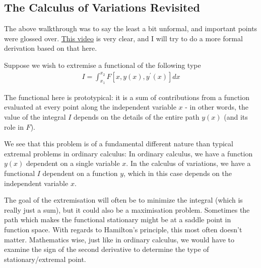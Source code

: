 \documentclass[a4paper]{article}
\begin{document}
    \subsection{The Calculus of Variations Revisited}
    The above walkthrough was to say the least a bit unformal, and important points were glossed over. \href{https://www.youtube.com/watch?v=VCHFCXgYdvY&list=PL2ym2L69yzkamORF9DGWRhE9qUnb0_-6H&index=1&t=230s&ab_channel=GoodVibrationswithFreeball}{This video} is very clear, and I will try to do a more formal derivation based on that here.

    Suppose we wish to extremise a functional of the following type \begin{align*}
        I = \int_{x_1} ^{x_2} F\left[x, y(x), y^{\prime}(x)\right]dx
    \end{align*}

    The functional here is prototypical: it is a sum of contributions from a function evaluated at every point along the independent variable \(x\) - in other words, the value of the integral \(I\) depends on the details of the entire path \(y(x)\) (and its role in \(F\)).
    
    We see that this problem is of a fundamental different nature than typical extremal problems in ordinary calculus: In ordinary calculus, we have a function \(y(x)\) dependent on a single variable \(x\). In the calculus of variations, we have a functional \(I\) dependent on a function \(y\), which in this case depends on the independent variable \(x\).     

    The goal of the extremisation will often be to minimize the integral (which is really just a sum), but it could also be a maximisation problem. Sometimes the path which makes the functional stationary might be at a saddle point in function space. With regards to Hamilton's principle, this most often doesn't matter. Mathematics wise, just like in ordinary calculus, we would have to examine the sign of the second derivative to determine the type of stationary/extremal point. 
\end{document}

